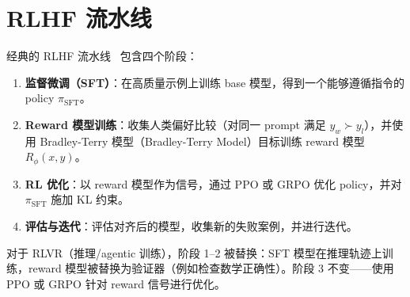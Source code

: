 \section{RLHF 流水线}
\label{the-rlhf-pipeline}

经典的 RLHF 流水线~\cite{ouyang2022training} 包含四个阶段：

\begin{enumerate}
  \item \textbf{监督微调（SFT）}：在高质量示例上训练 base 模型，得到一个能够遵循指令的 policy $\pi_{\text{SFT}}$。
  \item \textbf{Reward 模型训练}：收集人类偏好比较（对同一 prompt 满足 $y_w \succ y_l$），并使用 Bradley-Terry 模型（Bradley-Terry Model）目标训练 reward 模型 $R_\phi(x, y)$。
  \item \textbf{RL 优化}：以 reward 模型作为信号，通过 PPO 或 GRPO 优化 policy，并对 $\pi_{\text{SFT}}$ 施加 KL 约束。
  \item \textbf{评估与迭代}：评估对齐后的模型，收集新的失败案例，并进行迭代。
\end{enumerate}

对于 RLVR（推理/agentic 训练），阶段 1--2 被替换：SFT 模型在推理轨迹上训练，reward 模型被替换为验证器（例如检查数学正确性）。阶段 3 不变——使用 PPO 或 GRPO 针对 reward 信号进行优化。

